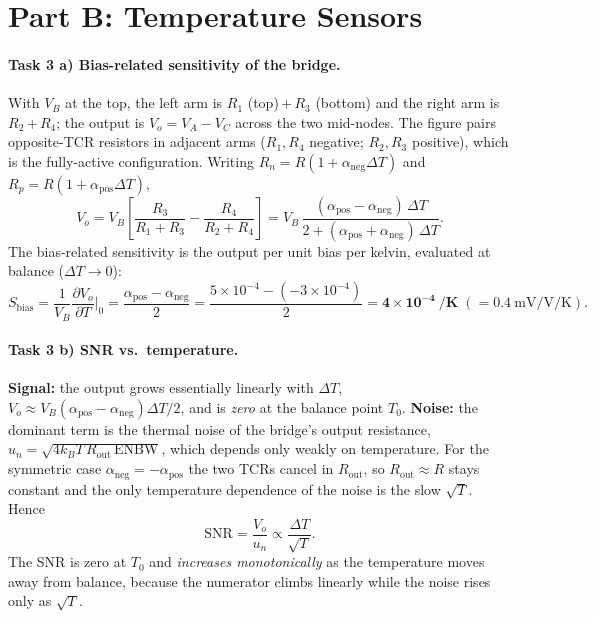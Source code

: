 \section*{Part B: Temperature Sensors}

\paragraph{Task 3 a) Bias-related sensitivity of the bridge.}
With $V_B$ at the top, the left arm is $R_1$ (top)\,$+$\,$R_3$ (bottom) and the right arm is
$R_2$\,$+$\,$R_4$; the output is $V_o=V_A-V_C$ across the two mid-nodes. The figure pairs
opposite-TCR resistors in adjacent arms ($R_1,R_4$ negative; $R_2,R_3$ positive), which is the
fully-active configuration. Writing $R_n=R(1+\alpha_{\mathrm{neg}}\Delta T)$ and
$R_p=R(1+\alpha_{\mathrm{pos}}\Delta T)$,
\[
V_o=V_B\!\left[\frac{R_3}{R_1+R_3}-\frac{R_4}{R_2+R_4}\right]
   =V_B\,\frac{(\alpha_{\mathrm{pos}}-\alpha_{\mathrm{neg}})\,\Delta T}{2+(\alpha_{\mathrm{pos}}+\alpha_{\mathrm{neg}})\,\Delta T}.
\]
The bias-related sensitivity is the output per unit bias per kelvin, evaluated at balance
($\Delta T\!\to\!0$):
\[
S_{\mathrm{bias}}=\frac{1}{V_B}\frac{\partial V_o}{\partial T}\bigg|_{0}
=\frac{\alpha_{\mathrm{pos}}-\alpha_{\mathrm{neg}}}{2}
=\frac{5\times10^{-4}-(-3\times10^{-4})}{2}
=\mathbf{4\times10^{-4}\ \si{\per\kelvin}}\;(=\SI{0.4}{\milli\volt\per\volt\per\kelvin}).
\]

\paragraph{Task 3 b) SNR vs.\ temperature.}
\textbf{Signal:} the output grows essentially linearly with $\Delta T$,
$V_o\approx V_B(\alpha_{\mathrm{pos}}-\alpha_{\mathrm{neg}})\Delta T/2$, and is \emph{zero} at the
balance point $T_0$. \textbf{Noise:} the dominant term is the thermal noise of the bridge's output
resistance, $u_n=\sqrt{4k_BT\,R_{\mathrm{out}}\,\mathrm{ENBW}}$, which depends only weakly on
temperature. For the symmetric case $\alpha_{\mathrm{neg}}=-\alpha_{\mathrm{pos}}$ the two TCRs
cancel in $R_{\mathrm{out}}$, so $R_{\mathrm{out}}\approx R$ stays constant and the only temperature
dependence of the noise is the slow $\sqrt{T}$. Hence
\[
\mathrm{SNR}=\frac{V_o}{u_n}\propto\frac{\Delta T}{\sqrt{T}} .
\]
The SNR is zero at $T_0$ and \emph{increases monotonically} as the temperature moves away from
balance, because the numerator climbs linearly while the noise rises only as $\sqrt{T}$.

